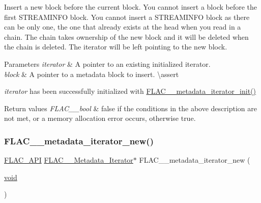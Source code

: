 Insert a new block before the current block. You cannot insert a block before the first S\+T\+R\+E\+A\+M\+I\+N\+FO block. You cannot insert a S\+T\+R\+E\+A\+M\+I\+N\+FO block as there can be only one, the one that already exists at the head when you read in a chain. The chain takes ownership of the new block and it will be deleted when the chain is deleted. The iterator will be left pointing to the new block.


\begin{DoxyParams}{Parameters}
{\em iterator} & A pointer to an existing initialized iterator. \\
\hline
{\em block} & A pointer to a metadata block to insert. \textbackslash{}assert 
\begin{DoxyCode}{1}
\end{DoxyCode}
 {\itshape iterator} has been successfully initialized with \mbox{\hyperlink{group__flac__metadata__level2_ga4a5af69a1f19436b02f738eb8c97c959}{F\+L\+A\+C\+\_\+\+\_\+metadata\+\_\+iterator\+\_\+init()}} \\
\hline
\end{DoxyParams}

\begin{DoxyRetVals}{Return values}
{\em F\+L\+A\+C\+\_\+\+\_\+bool} & {\ttfamily false} if the conditions in the above description are not met, or a memory allocation error occurs, otherwise {\ttfamily true}. \\
\hline
\end{DoxyRetVals}
\mbox{\label{group__flac__metadata__level2_gac988906d63bd2ddc910d8f0b118591f7}} 
\subsubsection{\texorpdfstring{FLAC\_\_metadata\_iterator\_new()}{FLAC\_\_metadata\_iterator\_new()}}
{\footnotesize\ttfamily \mbox{\hyperlink{group__flac__export_ga56ca07df8a23310707732b1c0007d6f5}{F\+L\+A\+C\+\_\+\+A\+PI}} \mbox{\hyperlink{group__flac__metadata__level2_ga9f3e135a07cdef7e51597646aa7b89b2}{F\+L\+A\+C\+\_\+\+\_\+\+Metadata\+\_\+\+Iterator}}$\ast$ F\+L\+A\+C\+\_\+\+\_\+metadata\+\_\+iterator\+\_\+new (\begin{DoxyParamCaption}\item[{\mbox{\hyperlink{_s_d_l__opengles2__gl2ext_8h_ae5d8fa23ad07c48bb609509eae494c95}{void}}}]{ }\end{DoxyParamCaption})}

